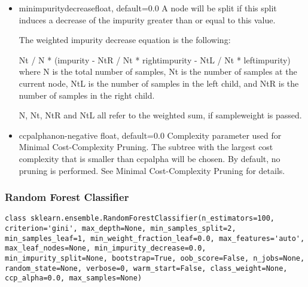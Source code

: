 \documentclass[12pt]{article}
\begin{document}
\begin{itemize}
\item
min\textunderscore impurity\textunderscore decreasefloat, default=0.0
A node will be split if this split induces a decrease of the impurity greater than or equal to this value.

The weighted impurity decrease equation is the following:

N\textunderscore t / N * (impurity - N\textunderscore t\textunderscore R / N\textunderscore t * right\textunderscore impurity
                    - N\textunderscore t\textunderscore L / N\textunderscore t * left\textunderscore impurity)
where N is the total number of samples, N\textunderscore t is the number of samples at the current node, N\textunderscore t\textunderscore L is the number of samples in the left child, and N\textunderscore t\textunderscore R is the number of samples in the right child.

N, N\textunderscore t, N\textunderscore t\textunderscore R and N\textunderscore t\textunderscore L all refer to the weighted sum, if sample\textunderscore weight is passed.


\item
ccp\textunderscore alphanon-negative float, default=0.0
Complexity parameter used for Minimal Cost-Complexity Pruning. The subtree with the largest cost complexity that is smaller than ccp\textunderscore alpha will be chosen. By default, no pruning is performed. See Minimal Cost-Complexity Pruning for details.

\end{itemize}

\newpage
\subsubsection{Random Forest Classifier}
\begin{lstlisting}
class sklearn.ensemble.RandomForestClassifier(n_estimators=100, criterion='gini', max_depth=None, min_samples_split=2, min_samples_leaf=1, min_weight_fraction_leaf=0.0, max_features='auto', max_leaf_nodes=None, min_impurity_decrease=0.0, min_impurity_split=None, bootstrap=True, oob_score=False, n_jobs=None, random_state=None, verbose=0, warm_start=False, class_weight=None, ccp_alpha=0.0, max_samples=None)
\end{lstlisting}
\end{document}
